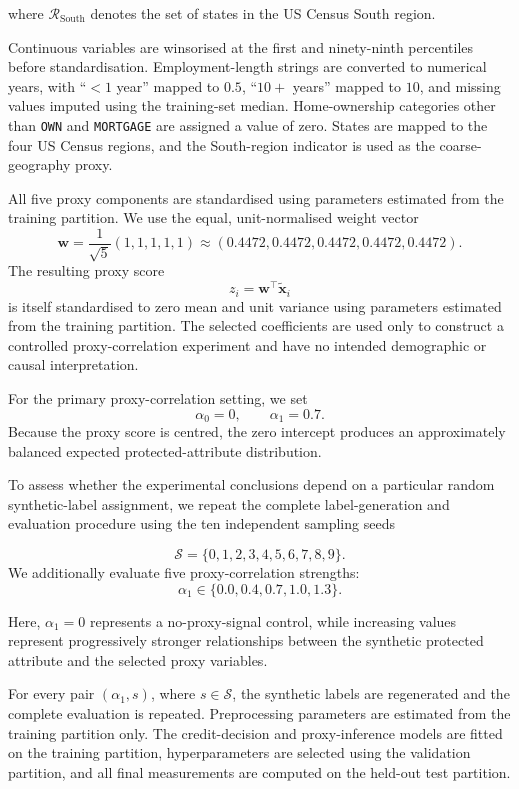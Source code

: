 \documentclass[a4paper,fleqn]{cas-dc}
\begin{document}
where $\mathcal{R}_{\mathrm{South}}$ denotes the set of states in the
US Census South region.

Continuous variables are winsorised at the first and ninety-ninth percentiles before standardisation. Employment-length strings are converted to numerical years, with ``$<1$ year'' mapped to $0.5$, ``$10+$ years'' mapped to $10$, and missing values imputed using the training-set median. Home-ownership categories other than \texttt{OWN} and \texttt{MORTGAGE} are assigned a value of zero. States are mapped to the four US Census regions, and the South-region indicator is used as the coarse-geography proxy.

All five proxy components are standardised using parameters estimated from
the training partition. We use the equal, unit-normalised weight vector
\[
\mathbf{w}
=
\frac{1}{\sqrt{5}}(1,1,1,1,1)
\approx
(0.4472,0.4472,0.4472,0.4472,0.4472).
\]
The resulting proxy score
\[
z_i
=
\mathbf{w}^{\top}\widetilde{\mathbf{x}}_i
\]
is itself standardised to zero mean and unit variance using parameters estimated from the training partition. The selected coefficients are used only to construct a controlled proxy-correlation experiment and have no intended demographic or causal interpretation.


For the primary proxy-correlation setting, we set
\[
\alpha_0=0,
\qquad
\alpha_1=0.7.
\]
Because the proxy score is centred, the zero intercept produces an approximately balanced expected protected-attribute distribution.

To assess whether the experimental conclusions depend on a particular random synthetic-label assignment, we repeat the complete label-generation and evaluation procedure using the ten independent sampling seeds

\[
\mathcal{S}
=
\{0,1,2,3,4,5,6,7,8,9\}.
\]
We additionally evaluate five proxy-correlation strengths:
\[
\alpha_1
\in
\{0.0,0.4,0.7,1.0,1.3\}.
\]

Here, $\alpha_1=0$ represents a no-proxy-signal control, while increasing values represent progressively stronger relationships between the synthetic protected attribute and the selected proxy variables.

For every pair $(\alpha_1,s)$, where $s\in\mathcal{S}$, the synthetic labels are regenerated and the complete evaluation is repeated. Preprocessing parameters are estimated from the training partition only. The credit-decision and proxy-inference models are fitted on the training partition, hyperparameters are selected using the validation partition, and all final measurements are computed on the held-out test partition.
\end{document}
